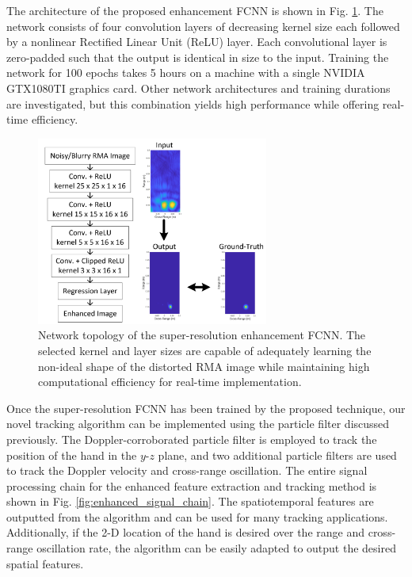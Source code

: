 \documentclass[10pt,journal,final]{IEEEtran}
\begin{document}
The architecture of the proposed enhancement FCNN is shown in Fig. \ref{fig:fcnn_architecture}.
The network consists of four convolution layers of decreasing kernel size each followed by a nonlinear Rectified Linear Unit (ReLU) layer. Each convolutional layer is zero-padded such that the output is identical in size to the input. 
Training the network for 100 epochs takes 5 hours on a machine with a single NVIDIA GTX1080TI graphics card. 
Other network architectures and training durations are investigated, but this combination yields high performance while offering real-time efficiency.
\begin{figure}[h]
	\centering
	\includegraphics[width=3in]{fcnn_architecture.jpg}
	\caption{Network topology of the super-resolution enhancement FCNN. The selected kernel and layer sizes are capable of adequately learning the non-ideal shape of the distorted RMA image while maintaining high computational efficiency for real-time implementation.}
	\label{fig:fcnn_architecture}
\end{figure}

Once the super-resolution FCNN has been trained by the proposed technique, our novel tracking algorithm can be implemented using the particle filter discussed previously.
The Doppler-corroborated particle filter is employed to track the position of the hand in the $y$-$z$ plane, and two additional particle filters are used to track the Doppler velocity and cross-range oscillation.
The entire signal processing chain for the enhanced feature extraction and tracking method is shown in Fig. \ref{fig:enhanced_signal_chain}.
The spatiotemporal features are outputted from the algorithm and can be used for many tracking applications.
Additionally, if the 2-D location of the hand is desired over the range and cross-range oscillation rate, the algorithm can be easily adapted to output the desired spatial features.
\end{document}

